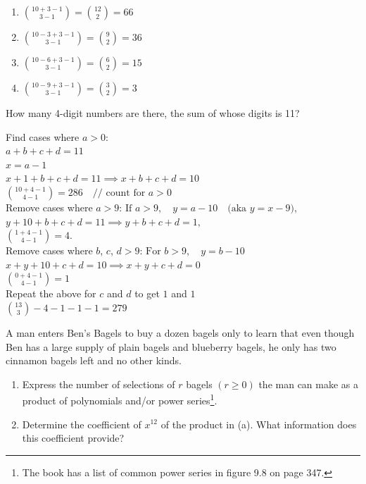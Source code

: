 \documentclass{homework}
\begin{document}
\begin{sol}
  \begin{enumerate}[label=(\alph*)]
    \item $\binom{10+3-1}{3-1} = \binom{12}{2} = 66$
    \item $\binom{10-3+3-1}{3-1} = \binom{9}{2} = 36$
    \item $\binom{10-6+3-1}{3-1} = \binom{6}{2} = 15$
    \item $\binom{10-9+3-1}{3-1} = \binom{3}{2} = 3$
  \end{enumerate}
\end{sol}

\question How many 4-digit numbers are there, the sum of whose digits is 11?

\begin{sol}
  Find cases where $a > 0$: \\
    $a + b + c + d = 11$ \\
    $x = a - 1$ \\
    $x + 1 + b + c + d = 11 \implies x + b + c + d = 10$ \\
    $\binom{10+4-1}{4-1} = 286 \quad \text{// count for } a > 0$ \\

  Remove cases where $a > 9$:
    $\text{If } a > 9, \quad y = a - 10 \quad \text{(aka } y = x - 9\text{)},$ \\
    $y + 10 + b + c + d = 11 \implies y + b + c + d = 1,$ \\
    $\binom{1+4-1}{4-1} = 4.$ \\

  Remove cases where $b$, $c$, $d > 9$:
    $\text{For } b > 9, \quad y = b - 10$ \\
    $x + y + 10 + c + d = 10 \implies x + y + c + d = 0$ \\
    $\binom{0+4-1}{4-1} = 1 $ \\

  Repeat the above for $c$ and $d$ to get $1$ and $1$ \\
  
  $\binom{13}{3} - 4 - 1 - 1 - 1 = 279$ \\
\end{sol}

\question A man enters Ben's Bagels to buy a dozen bagels only to learn that even though Ben has a large supply of plain bagels and blueberry bagels, he only has two cinnamon bagels left and no other kinds.
\begin{enumerate}[label=(\alph*)]
    \item Express the number of selections of $r$ bagels $(r \geq 0)$ the man can make as a product of polynomials and/or power series\footnote{The book has a list of common power series in figure 9.8 on page 347.}.
    \item Determine the coefficient of $x^{12}$ of the product in (a). What information does this coefficient provide?
\end{enumerate}
\end{document}
